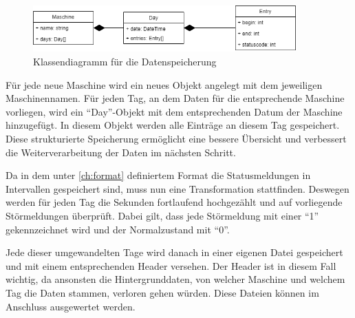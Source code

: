 \vspace{20pt}
\begin{figure}[tbph]
	\centering 
	\includegraphics[width=0.9\textwidth,keepaspectratio] {dataPreparation/images/transformationClass.png} 
	\caption{\label {fig:transformationClass} Klassendiagramm für die Datenspeicherung} 
\end{figure}

\vspace{15pt}

Für jede neue Maschine wird ein neues Objekt angelegt mit dem jeweiligen Maschinennamen. Für jeden Tag, an dem Daten für die entsprechende Maschine vorliegen, wird ein \enquote{Day}-Objekt mit dem entsprechenden Datum der Maschine hinzugefügt. In diesem Objekt werden alle Einträge an diesem Tag gespeichert. Diese strukturierte Speicherung ermöglicht eine bessere Übersicht und verbessert die Weiterverarbeitung der Daten im nächsten Schritt.

Da in dem unter \autoref{ch:format} definiertem Format die Statusmeldungen in Intervallen gespeichert sind, muss nun eine Transformation stattfinden. Deswegen werden für jeden Tag die Sekunden fortlaufend hochgezählt und auf vorliegende Störmeldungen überprüft. Dabei gilt, dass jede Störmeldung mit einer \enquote{1} gekennzeichnet wird und der Normalzustand mit \enquote{0}.

Jede dieser umgewandelten Tage wird danach in einer eigenen Datei gespeichert und mit einem entsprechenden Header versehen. Der Header ist in diesem Fall wichtig, da ansonsten die Hintergrunddaten, von welcher Maschine und welchem Tag die Daten stammen, verloren gehen würden. Diese Dateien können im Anschluss ausgewertet werden.
